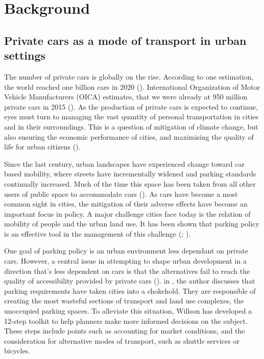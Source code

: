 \section{Background}
\subsection{Private cars as a mode of transport in urban settings}
\justify



The number of private cars is globally on the rise. According to one estimation, the world reached one billion cars in 2020 (\cite{Sperling2009}). International Organization of Motor Vehicle Manufacturers (OICA) estimates, that we were already at 950 million private cars in 2015 (\cite{OICA2020}). As the production of private cars is expected to continue, eyes must turn to managing the vast quantity of personal transportation in cities and in their surroundings. This is a question of mitigation of climate change, but also ensuring the economic performance of cities, and maximising the quality of life for urban citizens (\cite{Bertolini2003}).

Since the last century, urban landscapes have experienced change toward car based mobility, where streets have incrementally widened and parking standards continually increased. Much of the time this space has been taken from all other users of public space to accommodate cars (\cite{Cervero2017}). As cars have become a most common sight in cities, the mitigation of their adverse effects have become an important focus in policy. A major challenge cities face today is the relation of mobility of people and the urban land use. It has been shown that parking policy is an effective tool in the management of this challenge (\cite{Diallo2015}; \cite{Marsden2006}).

One goal of parking policy is an urban environment less dependant on private cars. However, a central issue in attempting to shape urban development in a direction that's less dependent on cars is that the alternatives fail to reach the quality of accessibility provided by private cars (\cite{Bertolini2003}). in , the author discusses that parking requirements have taken cities into a chokehold. They are responsible of creating the most wasteful sections of transport and land use complexes, the unoccupied parking spaces. To alleviate this situation, Willson has developed a 12-step toolkit to help planners make more informed decisions on the subject. These steps include points such as accounting for market conditions, and the consideration for alternative modes of transport, such as shuttle services or bicycles.

